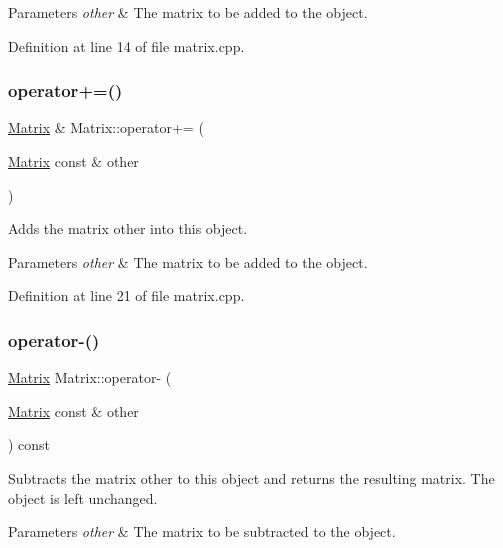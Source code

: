 \begin{DoxyParams}{Parameters}
{\em other} & The matrix to be added to the object. \\
\hline
\end{DoxyParams}


Definition at line 14 of file matrix.\+cpp.

\mbox{\label{classMatrix_a5f5d62f853a2ed97f2ba437036b1724d}} 
\subsubsection{\texorpdfstring{operator+=()}{operator+=()}}
{\footnotesize\ttfamily \hyperlink{classMatrix}{Matrix} \& Matrix\+::operator+= (\begin{DoxyParamCaption}\item[{\hyperlink{classMatrix}{Matrix} const \&}]{other }\end{DoxyParamCaption})}

Adds the matrix {\ttfamily other} into this object.


\begin{DoxyParams}{Parameters}
{\em other} & The matrix to be added to the object. \\
\hline
\end{DoxyParams}


Definition at line 21 of file matrix.\+cpp.

\mbox{\label{classMatrix_a5f7129af600c22b69abdcb2c3b204e5a}} 
\subsubsection{\texorpdfstring{operator-\/()}{operator-()}}
{\footnotesize\ttfamily \hyperlink{classMatrix}{Matrix} Matrix\+::operator-\/ (\begin{DoxyParamCaption}\item[{\hyperlink{classMatrix}{Matrix} const \&}]{other }\end{DoxyParamCaption}) const}

Subtracts the matrix {\ttfamily other} to this object and returns the resulting matrix. The object is left unchanged.


\begin{DoxyParams}{Parameters}
{\em other} & The matrix to be subtracted to the object. \\
\hline
\end{DoxyParams}


